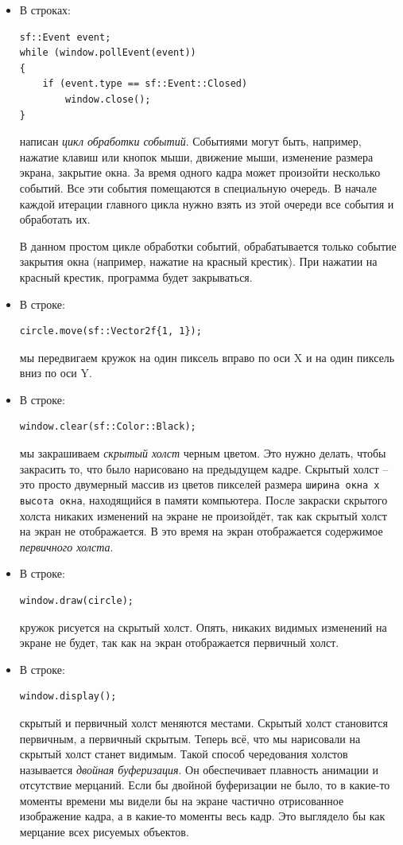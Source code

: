 \documentclass{article}
\begin{document}
\begin{itemize}
\item В строках:
\begin{lstlisting}[frame=none]
sf::Event event;
while (window.pollEvent(event)) 
{
    if (event.type == sf::Event::Closed)
        window.close();
}
\end{lstlisting}
написан \textit{цикл обработки событий}. Событиями могут быть, например, нажатие клавиш или кнопок мыши, движение мыши, изменение размера экрана, закрытие окна. За время одного кадра может произойти несколько событий. Все эти события помещаются в специальную очередь. В начале каждой итерации главного цикла нужно взять из этой очереди все события и обработать их.

В данном простом цикле обработки событий, обрабатывается только событие закрытия окна (например, нажатие на красный крестик). При нажатии на красный крестик, программа будет закрываться.

\item В строке:
\begin{lstlisting}[frame=none]
circle.move(sf::Vector2f{1, 1});
\end{lstlisting}
мы передвигаем кружок на один пиксель вправо по оси X и на один пиксель вниз по оси Y.

\item В строке:
\begin{lstlisting}[frame=none]
window.clear(sf::Color::Black);
\end{lstlisting}
мы закрашиваем \textit{скрытый холст} черным цветом. Это нужно делать, чтобы закрасить то, что было нарисовано на предыдущем кадре. Скрытый холст -- это просто двумерный массив из цветов пикселей размера \texttt{ширина окна x высота окна}, находящийся в памяти компьютера. После закраски скрытого холста никаких изменений на экране не произойдёт, так как скрытый холст на экран не отображается. В это время на экран отображается содержимое \textit{первичного холста}.


\item В строке:
\begin{lstlisting}[frame=none]
window.draw(circle);
\end{lstlisting}
кружок рисуется на скрытый холст. Опять, никаких видимых изменений на экране не будет, так как на экран отображается первичный холст.

\item В строке:
\begin{lstlisting}[frame=none]
window.display();
\end{lstlisting}
скрытый и первичный холст меняются местами. Скрытый холст становится первичным, а первичный скрытым. Теперь всё, что мы нарисовали на скрытый холст станет видимым. Такой способ чередования холстов называется \textit{двойная буферизация}. Он обеспечивает плавность анимации и отсутствие мерцаний. Если бы двойной буферизации не было, то в какие-то моменты времени мы видели бы на экране частично отрисованное изображение кадра, а в какие-то моменты весь кадр. Это выглядело бы как мерцание всех рисуемых объектов.
\end{itemize}
\end{document}
